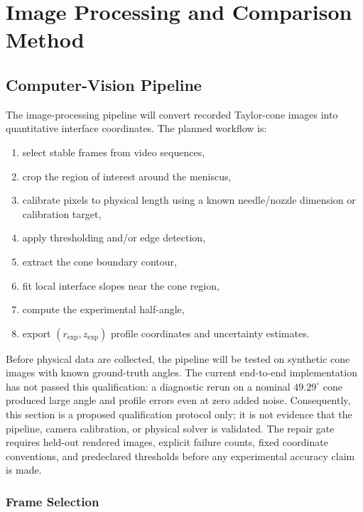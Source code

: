 \section{Image Processing and Comparison Method}\label{sec:image-processing}

\subsection{Computer-Vision Pipeline}

The image-processing pipeline will convert recorded Taylor-cone images into quantitative interface coordinates. The planned workflow is:
\begin{enumerate}
    \item select stable frames from video sequences,
    \item crop the region of interest around the meniscus,
    \item calibrate pixels to physical length using a known needle/nozzle dimension or calibration target,
    \item apply thresholding and/or edge detection,
    \item extract the cone boundary contour,
    \item fit local interface slopes near the cone region,
    \item compute the experimental half-angle,
    \item export $(r_{\mathrm{exp}},z_{\mathrm{exp}})$ profile coordinates and uncertainty estimates.
\end{enumerate}

Before physical data are collected, the pipeline will be tested on synthetic cone images with known ground-truth angles. The current end-to-end implementation has not passed this qualification: a diagnostic rerun on a nominal $49.29^{\circ}$ cone produced large angle and profile errors even at zero added noise. Consequently, this section is a proposed qualification protocol only; it is not evidence that the pipeline, camera calibration, or physical solver is validated. The repair gate requires held-out rendered images, explicit failure counts, fixed coordinate conventions, and predeclared thresholds before any experimental accuracy claim is made.

\subsubsection{Frame Selection}

